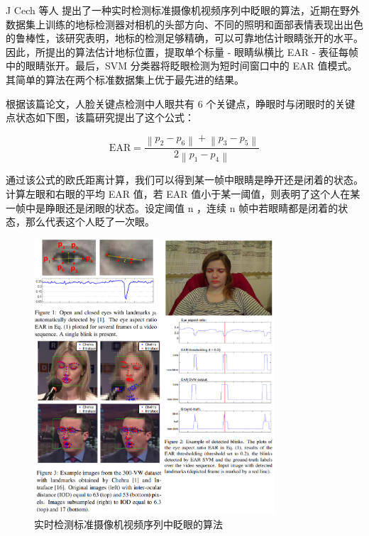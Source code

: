J Cech 等人 \cite{cech2016real}  提出了一种实时检测标准摄像机视频序列中眨眼的算法，近期在野外数据集上训练的地标检测器对相机的头部方向、不同的照明和面部表情表现出出色的鲁棒性，该研究表明，地标的检测足够精确，可以可靠地估计眼睛张开的水平。因此，所提出的算法估计地标位置，提取单个标量 - 眼睛纵横比 EAR - 表征每帧中的眼睛张开。最后，SVM 分类器将眨眼检测为短时间窗口中的 EAR 值模式。其简单的算法在两个标准数据集上优于最先进的结果。

根据该篇论文，人脸关键点检测中人眼共有 6 个关键点，睁眼时与闭眼时的关键点状态如下图，该篇研究提出了这个公式：

\begin{equation}
\mathrm{EAR}=\frac{\left\|p_{2}-p_{6}\right\|+\left\|p_{3}-p_{5}\right\|}{2\left\|p_{1}-p_{4}\right\|}
\end{equation}

通过该公式的欧氏距离计算，我们可以得到某一帧中眼睛是睁开还是闭着的状态。计算左眼和右眼的平均 EAR 值，若 EAR 值小于某一阈值，则表明了这个人在某一帧中是睁眼还是闭眼的状态。设定阈值 n ，连续 n 帧中若眼睛都是闭着的状态，那么代表这个人眨了一次眼。

\begin{figure}[htb]
\centering 
\includegraphics[width=0.80\textwidth]{img/ch3m1.png} 
\caption{实时检测标准摄像机视频序列中眨眼的算法}
\label{Test}
\end{figure}


